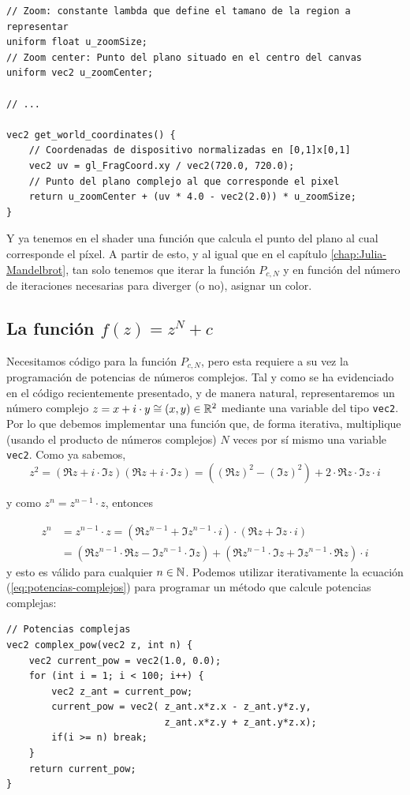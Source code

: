 \begin{lstlisting}
// Zoom: constante lambda que define el tamano de la region a representar
uniform float u_zoomSize;
// Zoom center: Punto del plano situado en el centro del canvas
uniform vec2 u_zoomCenter;

// ... 

vec2 get_world_coordinates() {
    // Coordenadas de dispositivo normalizadas en [0,1]x[0,1]
    vec2 uv = gl_FragCoord.xy / vec2(720.0, 720.0);
    // Punto del plano complejo al que corresponde el pixel
    return u_zoomCenter + (uv * 4.0 - vec2(2.0)) * u_zoomSize;
}
\end{lstlisting}

Y ya tenemos en el shader una función que calcula el punto del plano al cual corresponde el píxel. A partir de esto, y al igual que en el capítulo \ref{chap:Julia-Mandelbrot}, tan solo tenemos que iterar la función $P_{c,N}$ y en función del número de iteraciones necesarias para diverger (o no), asignar un color.

\subsection{La función $f(z)=z^N+c$}

Necesitamos código para la función $P_{c,N}$, pero esta requiere a su vez la programación de potencias de números complejos. Tal y como se ha evidenciado en el código recientemente presentado, y de manera natural, representaremos un número complejo $z=x+i\cdot y\cong (x,y)\in\mathbb{R}^2$ mediante una variable del tipo \verb|vec2|. Por lo que debemos implementar una función que, de forma iterativa, multiplique (usando el producto de números complejos) $N$ veces por sí mismo una variable \verb|vec2|. Como ya sabemos,
$$
z^2 = (\Re z+i\cdot \Im z)(\Re z+i\cdot \Im z) = ((\Re z)^2-(\Im z)^2) + 2\cdot\Re z\cdot\Im z\cdot i
$$

y como $z^n = z^{n-1}\cdot z$, entonces

\begin{equation}
    \label{eq:potencias-complejos}
    \begin{split}
        z^n & = z^{n-1}\cdot z = (\Re z^{n-1} + \Im z^{n-1}\cdot i)\cdot(\Re z + \Im z\cdot i) \\
        & = \left(\Re z^{n-1}\cdot\Re z - \Im z^{n-1}\cdot \Im z\right) + \left(\Re z^{n-1}\cdot\Im z + \Im z^{n-1}\cdot\Re z\right)\cdot i 
    \end{split}
\end{equation}
y esto es válido para cualquier $n\in\mathbb{N}$. Podemos utilizar iterativamente la ecuación (\ref{eq:potencias-complejos}) para programar un método que calcule potencias complejas:
\begin{lstlisting}
// Potencias complejas
vec2 complex_pow(vec2 z, int n) {
    vec2 current_pow = vec2(1.0, 0.0);
    for (int i = 1; i < 100; i++) {
        vec2 z_ant = current_pow;
        current_pow = vec2( z_ant.x*z.x - z_ant.y*z.y, 
                            z_ant.x*z.y + z_ant.y*z.x);
        if(i >= n) break;
    }
    return current_pow;
}
\end{lstlisting}

